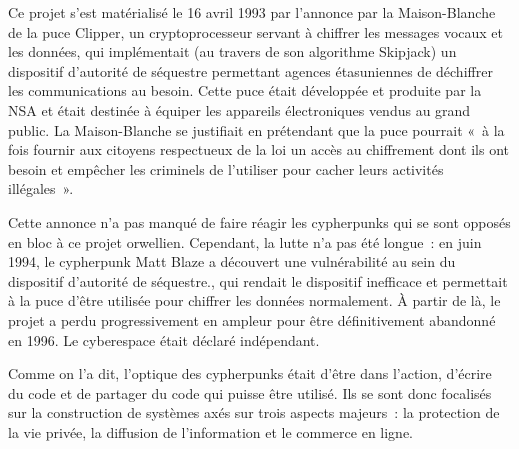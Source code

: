 Ce projet s'est matérialisé le 16 avril 1993 par l'annonce par la Maison-Blanche de la puce Clipper, un cryptoprocesseur servant à chiffrer les messages vocaux et les données, qui implémentait (au travers de son algorithme Skipjack) un dispositif d'autorité de séquestre permettant agences étasuniennes de déchiffrer les communications au besoin. Cette puce était développée et produite par la NSA et était destinée à équiper les appareils électroniques vendus au grand public. La Maison-Blanche se justifiait en prétendant que la puce pourrait «~à la fois fournir aux citoyens respectueux de la loi un accès au chiffrement dont ils ont besoin et empêcher les criminels de l'utiliser pour cacher leurs activités illégales~».

Cette annonce n'a pas manqué de faire réagir les cypherpunks qui se sont opposés en bloc à ce projet orwellien. Cependant, la lutte n'a pas été longue~: en juin 1994, le cypherpunk Matt Blaze a découvert une vulnérabilité au sein du dispositif d'autorité de séquestre., qui rendait le dispositif inefficace et permettait à la puce d'être utilisée pour chiffrer les données normalement. À partir de là, le projet a perdu progressivement en ampleur pour être définitivement abandonné en 1996. Le cyberespace était déclaré indépendant.


Comme on l'a dit, l'optique des cypherpunks était d'être dans l'action, d'écrire du code et de partager du code qui puisse être utilisé. Ils se sont donc focalisés sur la construction de systèmes axés sur trois aspects majeurs~: la protection de la vie privée, la diffusion de l'information et le commerce en ligne. %

